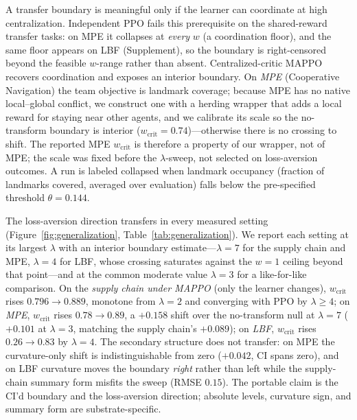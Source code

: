 \documentclass[letterpaper]{article} %
\theoremstyle{plain}
\newcommand{\wcrit}{w_{\mathrm{crit}}}
\begin{document}
A transfer boundary is meaningful only if the learner can coordinate at high centralization.
Independent PPO fails this prerequisite on the shared-reward transfer tasks: on MPE it collapses at
\emph{every} $w$ (a coordination floor), and the same floor appears on LBF (Supplement), so the
boundary is right-censored beyond the feasible $w$-range rather than absent. Centralized-critic
MAPPO~\citep{yu2022surprising} recovers coordination and exposes an interior boundary. On \emph{MPE}
(Cooperative Navigation) the team objective is landmark coverage; because MPE has no native
local--global conflict, we construct one with a herding wrapper that adds a local reward for staying
near other agents, and we calibrate its scale so the no-transform boundary is interior
($\wcrit=0.74$)---otherwise there is no crossing to shift. The reported MPE $\wcrit$ is therefore a
property of our wrapper, not of MPE; the scale was fixed before the $\lambda$-sweep, not selected on
loss-aversion outcomes. A run is labeled collapsed when landmark occupancy (fraction of landmarks
covered, averaged over evaluation) falls below the pre-specified threshold $\theta=0.144$.

The loss-aversion direction transfers in every measured setting
(Figure~\ref{fig:generalization}, Table~\ref{tab:generalization}). We report each setting at its
largest $\lambda$ with an interior boundary estimate---$\lambda{=}7$ for the supply chain and MPE,
$\lambda{=}4$ for LBF, whose crossing saturates against the $w{=}1$ ceiling beyond that point---and
at the common moderate value $\lambda{=}3$ for a like-for-like comparison. On the \emph{supply chain
under MAPPO} (only the learner changes), $\wcrit$ rises $0.796\to0.889$, monotone from $\lambda{=}2$
and converging with PPO by $\lambda\!\geq\!4$; on \emph{MPE}, $\wcrit$ rises $0.78\to0.89$, a
$+0.158$ shift over the no-transform null at $\lambda{=}7$ ($+0.101$ at $\lambda{=}3$, matching the
supply chain's $+0.089$); on \emph{LBF}, $\wcrit$ rises $0.26\to0.83$ by $\lambda{=}4$. The secondary
structure does not transfer: on MPE the curvature-only shift is indistinguishable from zero
($+0.042$, CI spans zero), and on LBF curvature moves the boundary \emph{right} rather than left
while the supply-chain summary form misfits the sweep (RMSE $0.15$). The portable claim is the CI'd
boundary and the loss-aversion direction; absolute levels, curvature sign, and summary form are
substrate-specific.
\end{document}
